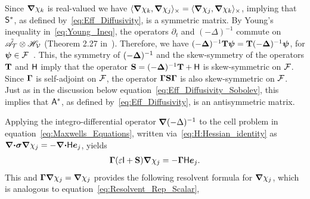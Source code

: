 \documentclass[amsa]{ipart}
\begin{document}
  
Since $\mbox{\boldmath${\nabla}$}\chi_k$ is real-valued we have 
$\langle\mbox{\boldmath${\nabla}$}\chi_k,\mbox{\boldmath${\nabla}$}\chi_j\rangle_\times=\langle\mbox{\boldmath${\nabla}$}\chi_j,\mbox{\boldmath${\nabla}$}\chi_k\rangle_\times$, implying that
$\mathsf{S}^*$, as defined by~\eqref{eq:Eff_Diffusivity}, is a symmetric
matrix. By Young's inequality  
in~\eqref{eq:Young_Ineq}, the operators $\partial_t$ and $(-\Delta)^{-1}$
commute on $\tilde{\mathscr{A}}_{\mathcal{T}}\otimes\mathscr{H}_{\mathcal{V}}$ (Theorem 2.27
in~\cite{Folland:99:RealAnalysis}). Therefore,  we have
$(-\mbox{\boldmath${\Delta}$})^{-1}\mathbf{T}\boldsymbol{\psi}=\mathbf{T}(-\mbox{\boldmath${\Delta}$})^{-1}\boldsymbol{\psi}$, for
$\boldsymbol{\psi}\in\mathcal{F}$~\cite{Folland:99:RealAnalysis,Stakgold:BVP:2000}. This,
the symmetry of $(-\mbox{\boldmath${\Delta}$})^{-1}$ and the skew-symmetry of the
operators $\mathbf{T}$ and $\mathsf{H}$ imply that the operator 
$\mathbf{S}=(-\mbox{\boldmath${\Delta}$})^{-1}\mathbf{T}+\mathsf{H}$ is skew-symmetric on
$\mathcal{F}$. Since $\mbox{\boldmath${\Gamma}$}$ is self-adjoint on $\mathcal{F}$, the operator
$\mbox{\boldmath${\Gamma}$}\mathbf{S}\mbox{\boldmath${\Gamma}$}$ is also skew-symmetric on $\mathcal{F}$. Just as in the
discussion below equation~\eqref{eq:Eff_Diffusivity_Sobolev}, this
implies that $\mathsf{A}^*$, as defined by~\eqref{eq:Eff_Diffusivity}, is an
antisymmetric matrix. 


Applying the integro-differential operator $\mbox{\boldmath${\nabla}$}(-\Delta)^{-1}$ to the
cell problem in equation~\eqref{eq:Maxwells_Equations}, written
via~\eqref{eq:H:Hessian_identity} as
$\mbox{\boldmath${\nabla}$}\mbox{\boldmath${\cdot}$}\mbox{\boldmath${\sigma}$}\mbox{\boldmath${\nabla}$}\chi_j=-\mbox{\boldmath${\nabla}$}\mbox{\boldmath${\cdot}$}\mathsf{H}\boldsymbol{e}_j$, yields 
%
\begin{align}\label{eq:Pre_Resolvent}
  \bGamma(\varepsilon\Ib+\Sb)\bnabla \chi_j=-\bGamma\Hm\vece_j.
\end{align}
%
This and $\mbox{\boldmath${\Gamma}$}\mbox{\boldmath${\nabla}$}\chi_j=\mbox{\boldmath${\nabla}$}\chi_j$ provides the
following resolvent formula for $\mbox{\boldmath${\nabla}$}\chi_j$, which is analogous to 
equation~\eqref{eq:Resolvent_Rep_Scalar},
\end{document}
